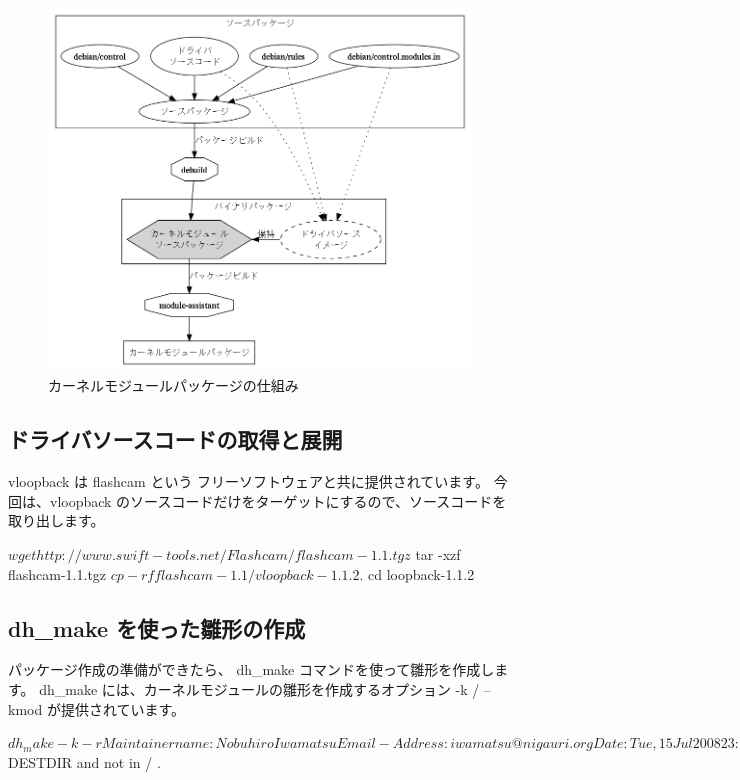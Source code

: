 \documentclass[mingoth,a4paper]{jsarticle}
\begin{document}
\begin{figure}[h]
 \begin{center}
  \includegraphics[width=0.8\hsize]{image200807/kmod0.png}
 \end{center}
 \caption{カーネルモジュールパッケージの仕組み}
 \label{fig:mod0}
\end{figure}

\subsection{ドライバソースコードの取得と展開}
vloopback は flashcam という フリーソフトウェアと共に提供されています。
今回は、vloopback のソースコードだけをターゲットにするので、ソースコードを
取り出します。
\begin{commandline}
$ wget http://www.swift-tools.net/Flashcam/flashcam-1.1.tgz
$ tar -xzf flashcam-1.1.tgz
$ cp -rf flashcam-1.1/vloopback-1.1.2 .
$ cd loopback-1.1.2
\end{commandline}

\subsection{dh\_make を使った雛形の作成}
パッケージ作成の準備ができたら、 dh\_make コマンドを使って雛形を作成します。
dh\_make には、カーネルモジュールの雛形を作成するオプション -k / --kmod が提供されています。

\begin{commandline}
$ dh_make -k -r 
Maintainer name : Nobuhiro Iwamatsu
Email-Address   : iwamatsu@nigauri.org 
Date            : Tue, 15 Jul 2008 23:21:23 +0900
Package Name    : vloopback
Version         : 1.1.2
License         : blank
Using dpatch    : no
Type of Package : Kernel Module
Hit <enter> to confirm: 
Done. Please edit the files in the debian/ subdirectory now. You should also
check that the vloopback Makefiles install into $DESTDIR and not in / .
\end{commandline}
\end{document}
